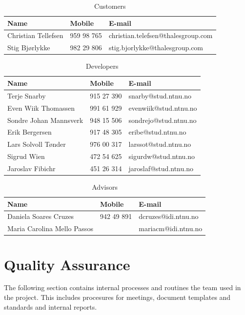 \begin{table}[!htb] \footnotesize \center
\caption{Customers\label{tab:plan:customer}}
\begin{tabular}{l l l}
	\toprule
	Name & Mobile & E-mail \\ 
	\midrule
	Christian Tellefsen & 959 98 765 & christian.telefsen@thalesgroup.com \\ 
	Stig Bjørlykke & 982 29 806 & stig.bjorlykke@thalesgroup.com \\ 
	\bottomrule
\end{tabular}
\end{table}

\begin{table}[!htb] \footnotesize \center
\caption{Developers\label{tab:plan:devs}}
\begin{tabular}{l l l}
	\toprule
	Name & Mobile & E-mail  \\ 
	\midrule
	Terje Snarby & 915 27 390 & snarby@stud.ntnu.no \\ 
	Even Wiik Thomassen & 991 61 929 & evenwiik@stud.ntnu.no \\ 
	Sondre Johan Mannsverk & 948 15 506 & sondrejo@stud.ntnu.no \\ 
	Erik Bergersen & 917 48 305 & eribe@stud.ntnu.no \\ 
	Lars Solvoll Tønder & 976 00 317 & larssot@stud.ntnu.no \\ 
	Sigrud Wien & 472 54 625 & sigurdw@stud.ntnu.no \\ 
	Jaroslav Fibichr & 451 26 314 & jaroslaf@stud.ntnu.no \\ 
	\bottomrule
\end{tabular}
\end{table}

\begin{table}[!htb] \footnotesize \center
\caption{Advisors\label{tab:plan:advisors}}
\begin{tabular}{l l l}
	\toprule
	Name & Mobile & E-mail \\ 
	\midrule
	Daniela Soares Cruzes & 942 49 891 & dcruzes@idi.ntnu.no \\ 
	Maria Carolina Mello Passos & & mariacm@idi.ntnu.no \\ 
	\bottomrule
\end{tabular}
\end{table}


\section{Quality Assurance}
\label{sec:plan:qa}
The following section contains internal processes and routines the team used in the project. This includes procesures for meetings, document templates and standards and internal reports.

